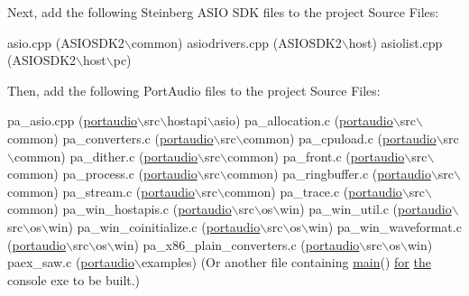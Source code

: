 Next, add the following Steinberg A\+S\+IO S\+DK files to the project Source Files\+:


\begin{DoxyCode}
asio.cpp                        (ASIOSDK2\(\backslash\)common)
asiodrivers.cpp                 (ASIOSDK2\(\backslash\)host)
asiolist.cpp                    (ASIOSDK2\(\backslash\)host\(\backslash\)pc)
\end{DoxyCode}


Then, add the following Port\+Audio files to the project Source Files\+:


\begin{DoxyCode}
pa\_asio.cpp                     (\hyperlink{namespaceportaudio}{portaudio}\(\backslash\)src\(\backslash\)hostapi\(\backslash\)asio)
pa\_allocation.c                 (\hyperlink{namespaceportaudio}{portaudio}\(\backslash\)src\(\backslash\)common)
pa\_converters.c                 (\hyperlink{namespaceportaudio}{portaudio}\(\backslash\)src\(\backslash\)common)
pa\_cpuload.c                    (\hyperlink{namespaceportaudio}{portaudio}\(\backslash\)src\(\backslash\)common)
pa\_dither.c                     (\hyperlink{namespaceportaudio}{portaudio}\(\backslash\)src\(\backslash\)common)
pa\_front.c                      (\hyperlink{namespaceportaudio}{portaudio}\(\backslash\)src\(\backslash\)common)
pa\_process.c                    (\hyperlink{namespaceportaudio}{portaudio}\(\backslash\)src\(\backslash\)common)
pa\_ringbuffer.c                 (\hyperlink{namespaceportaudio}{portaudio}\(\backslash\)src\(\backslash\)common)
pa\_stream.c                     (\hyperlink{namespaceportaudio}{portaudio}\(\backslash\)src\(\backslash\)common)
pa\_trace.c                      (\hyperlink{namespaceportaudio}{portaudio}\(\backslash\)src\(\backslash\)common)
pa\_win\_hostapis.c               (\hyperlink{namespaceportaudio}{portaudio}\(\backslash\)src\(\backslash\)os\(\backslash\)win)
pa\_win\_util.c                   (\hyperlink{namespaceportaudio}{portaudio}\(\backslash\)src\(\backslash\)os\(\backslash\)win)
pa\_win\_coinitialize.c           (\hyperlink{namespaceportaudio}{portaudio}\(\backslash\)src\(\backslash\)os\(\backslash\)win)
pa\_win\_waveformat.c             (\hyperlink{namespaceportaudio}{portaudio}\(\backslash\)src\(\backslash\)os\(\backslash\)win)
pa\_x86\_plain\_converters.c       (\hyperlink{namespaceportaudio}{portaudio}\(\backslash\)src\(\backslash\)os\(\backslash\)win)
paex\_saw.c                      (\hyperlink{namespaceportaudio}{portaudio}\(\backslash\)examples)  (Or another file containing 
      \hyperlink{elements_8c_a0ddf1224851353fc92bfbff6f499fa97}{main}() 
                                                      \hyperlink{hashrout_8h_af69473f95324d0c0f91fdfb1d1a00360}{for} \hyperlink{nasm_8h_aaf57ffcfef0bee04f46c6ada2a905a8c}{the} console exe to be built.)
\end{DoxyCode}


